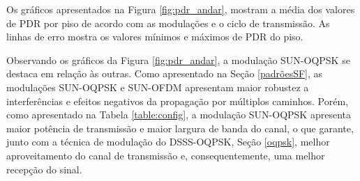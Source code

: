 
Os gráficos apresentados na Figura \ref{fig:pdr_andar}, mostram a média dos valores de PDR por piso de acordo com as modulações e o ciclo de transmissão. As linhas de erro mostra os valores mínimos e máximos de PDR do piso.

Observando os gráficos da Figura \ref{fig:pdr_andar}, a modulação SUN-OQPSK se destaca em relação às outras. Como apresentado na Seção \ref{padrõesSF}, as modulações SUN-OQPSK e SUN-OFDM apresentam maior robustez a interferências e efeitos negativos da propagação por múltiplos caminhos. Porém, como apresentado na Tabela \ref{table:config}, a modulação SUN-OQPSK apresenta maior potência de transmissão e maior largura de banda do canal, o que garante, junto com a técnica de modulação do DSSS-OQPSK, Seção \ref{oqpsk}, melhor aproveitamento do canal de transmissão e, consequentemente, uma melhor recepção do sinal.

